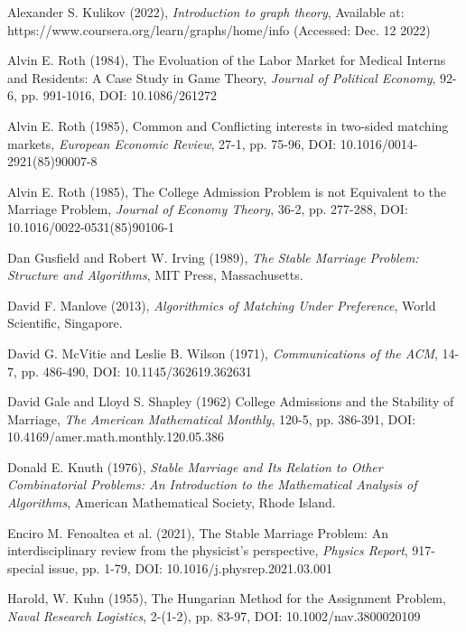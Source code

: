 \documentclass[14pt]{extarticle}
\begin{document}
\begin{thebibliography}{99}

  Alexander S. Kulikov (2022), 
  {\it Introduction to graph theory},
  Available at: https://www.coursera.org/learn/graphs/home/info (Accessed: Dec. 12 2022)

  Alvin E. Roth (1984), The Evoluation of the Labor Market for Medical Interns and Residents: A Case Study in Game Theory,
  {\it Journal of Political Economy},
  92-6, pp. 991-1016, DOI: 10.1086/261272

  Alvin E. Roth (1985), Common and Conflicting interests in two-sided matching markets,
  {\it European Economic Review},
  27-1, pp. 75-96, DOI: 10.1016/0014-2921(85)90007-8

  Alvin E. Roth (1985), The College Admission Problem is not Equivalent to the Marriage Problem,
  {\it Journal of Economy Theory},
  36-2, pp. 277-288, DOI: 10.1016/0022-0531(85)90106-1

  Dan Gusfield and Robert W. Irving (1989),
  {\it The Stable Marriage Problem: Structure and Algorithms},
  MIT Press, Massachusetts.

  David F. Manlove (2013),
  {\it Algorithmics of Matching Under Preference},
  World Scientific, Singapore.

  David G. McVitie and Leslie B. Wilson (1971),
  {\it Communications of the ACM},
  14-7, pp. 486-490, DOI: 10.1145/362619.362631

  David Gale and Lloyd S. Shapley (1962) College Admissions and the Stability of Marriage,
  {\it The American Mathematical Monthly}, 
  120-5, pp. 386-391, DOI: 10.4169/amer.math.monthly.120.05.386

  Donald E. Knuth (1976),
  {\it Stable Marriage and Its Relation to Other Combinatorial Problems: An Introduction to the Mathematical Analysis of Algorithms},
  American Mathematical Society, Rhode Island.

  Enciro M. Fenoaltea et al. (2021), The Stable Marriage Problem: An interdisciplinary review from the physicist’s perspective,
  {\it Physics Report},
  917-special issue, pp. 1-79, DOI: 10.1016/j.physrep.2021.03.001

  Harold, W. Kuhn (1955), The Hungarian Method for the Assignment Problem,
  {\it Naval Research Logistics},
  2-(1-2), pp. 83-97, DOI: 10.1002/nav.3800020109


\end{thebibliography}
\end{document}
